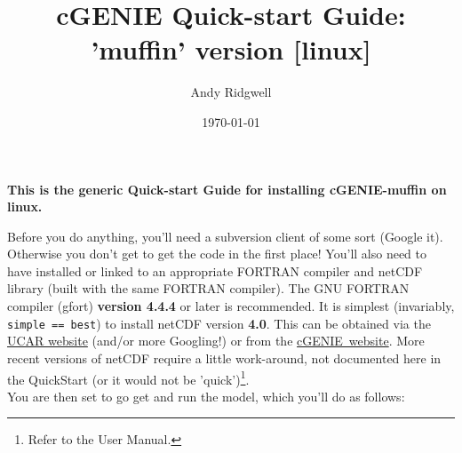 \documentclass[10pt,twoside]{article}
\title{cGENIE Quick-start Guide: 'muffin' version [linux]}
\author{Andy Ridgwell}
\date{\today}
\begin{document}

\maketitle


\noindent \textbf{This is the generic Quick-start Guide for installing cGENIE-muffin on linux.}

\noindent Before you do anything, you'll need a subversion client of some sort (Google it). Otherwise you don't get to get the code in the first place! You'll also need to have installed or linked to an appropriate FORTRAN compiler and netCDF library (built with the same FORTRAN compiler). The GNU FORTRAN compiler (gfort) \textbf{version 4.4.4} or later is recommended. It is simplest (invariably, \texttt{simple == best}) to install netCDF version \textbf{4.0}. This can be obtained via the \href{http://www.unidata.ucar.edu/software/netcdf/}{UCAR website} (and/or more Googling!) or from the \href{http://www.seao2.info//cgenie/software/netcdf-4.0.tar.gz}{cGENIE\ website}. More recent versions of netCDF require a little work-around, not documented here in the QuickStart (or it would not be 'quick')\footnote{Refer to the User Manual.}.
\\ You are then set to go get and run the model, which you'll do as follows:
\end{document}
